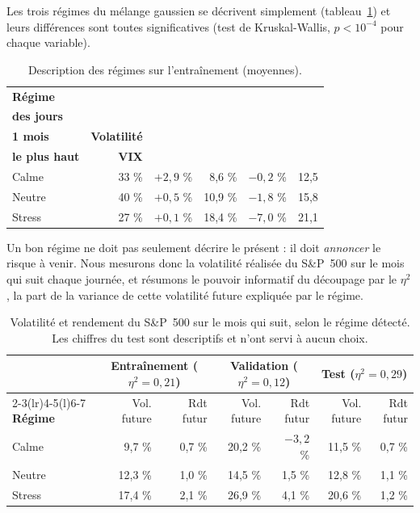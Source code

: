 Les trois régimes du mélange gaussien se décrivent simplement (tableau~\ref{tab:regimes}) et leurs différences sont toutes significatives (test de Kruskal-Wallis, $p < 10^{-4}$ pour chaque variable).

\begin{table}[!htb]
  \centering
  \small
  \caption{Description des régimes sur l'entraînement (moyennes).}
  \label{tab:regimes}
  \begin{tabular}{@{}l r r r r r@{}}
    \toprule
    \textbf{Régime} & \shortstack[r]{\textbf{Part}\\\textbf{des jours}} & \shortstack[r]{\textbf{Rendement}\\\textbf{1 mois}} & \textbf{Volatilité} & \shortstack[r]{\textbf{Perte depuis}\\\textbf{le plus haut}} & \textbf{VIX} \\
    \midrule
    Calme & 33 \% & $+2{,}9$ \% & 8,6 \% & $-0{,}2$ \% & 12,5 \\
    Neutre & 40 \% & $+0{,}5$ \% & 10,9 \% & $-1{,}8$ \% & 15,8 \\
    Stress & 27 \% & $+0{,}1$ \% & 18,4 \% & $-7{,}0$ \% & 21,1 \\
    \bottomrule
  \end{tabular}
\end{table}

Un bon régime ne doit pas seulement décrire le présent : il doit \emph{annoncer} le risque à venir. Nous mesurons donc la volatilité réalisée du S\&P~500 sur le mois qui suit chaque journée, et résumons le pouvoir informatif du découpage par le $\eta^2$, la part de la variance de cette volatilité future expliquée par le régime.

\begin{table}[!htb]
  \centering
  \small
  \caption{Volatilité et rendement du S\&P~500 sur le mois qui suit, selon le régime détecté. Les chiffres du test sont descriptifs et n'ont servi à aucun choix.}
  \label{tab:regimes_validation}
  \footnotesize\setlength{\tabcolsep}{4pt}
  \begin{tabular}{@{}l r r r r r r@{}}
    \toprule
     & \multicolumn{2}{c}{\textbf{Entraînement} ($\eta^2 = 0{,}21$)} & \multicolumn{2}{c}{\textbf{Validation} ($\eta^2 = 0{,}12$)} & \multicolumn{2}{c}{\textbf{Test} ($\eta^2 = 0{,}29$)} \\
    \cmidrule(lr){2-3}\cmidrule(lr){4-5}\cmidrule(l){6-7}
    \textbf{Régime} & Vol. future & Rdt futur & Vol. future & Rdt futur & Vol. future & Rdt futur \\
    \midrule
    Calme & 9,7 \% & 0,7 \% & 20,2 \% & $-3{,}2$ \% & 11,5 \% & 0,7 \% \\
    Neutre & 12,3 \% & 1,0 \% & 14,5 \% & 1,5 \% & 12,8 \% & 1,1 \% \\
    Stress & 17,4 \% & 2,1 \% & 26,9 \% & 4,1 \% & 20,6 \% & 1,2 \% \\
    \bottomrule
  \end{tabular}
\end{table}


